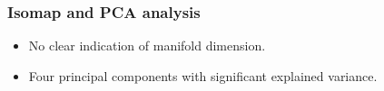 \documentclass[svgnames, table, smaller]{beamer}
\begin{document}
\begin{frame}
  \frametitle{Isomap and PCA analysis}
  
  \begin{itemize}
  \item No clear indication of manifold dimension.
  \item Four principal components with significant explained variance.
  \end{itemize}


  \begin{figure}[ht]
    \begin{center}
      \label{gtvovars}
    \end{center}
  \end{figure}


\end{frame}
\end{document}
